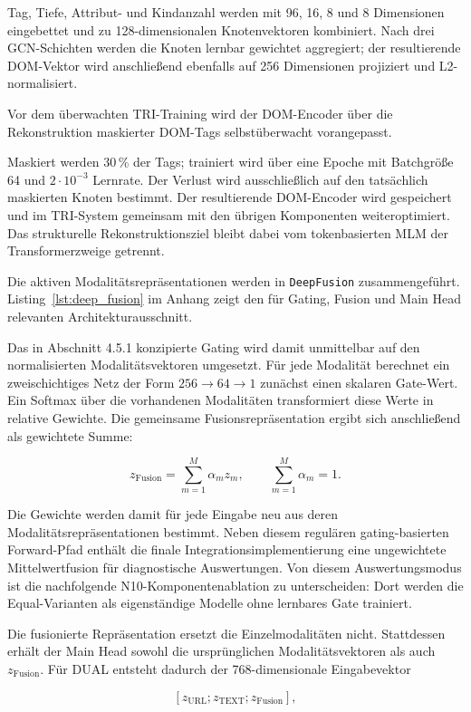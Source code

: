 Tag, Tiefe, Attribut- und Kindanzahl werden mit 96, 16, 8 und 8 Dimensionen eingebettet
und zu 128-dimensionalen Knotenvektoren kombiniert. Nach drei GCN-Schichten werden die
Knoten lernbar gewichtet aggregiert; der resultierende DOM-Vektor wird anschließend ebenfalls
auf 256 Dimensionen projiziert und L2-normalisiert.

Vor dem überwachten TRI-Training wird der DOM-Encoder über die Rekonstruktion maskierter
DOM-Tags selbstüberwacht vorangepasst.

Maskiert werden 30\,\% der Tags; trainiert wird über eine Epoche mit Batchgröße 64 und
$2\cdot10^{-3}$ Lernrate. Der Verlust wird ausschließlich auf den tatsächlich maskierten
Knoten bestimmt. Der resultierende DOM-Encoder wird gespeichert und im TRI-System
gemeinsam mit den übrigen Komponenten weiteroptimiert. Das strukturelle Rekonstruktionsziel
bleibt dabei vom tokenbasierten MLM der Transformerzweige getrennt.

Die aktiven Modalitätsrepräsentationen werden in \texttt{DeepFusion} zusammengeführt.
Listing~\ref{lst:deep_fusion} im Anhang zeigt den für Gating, Fusion und Main Head relevanten
Architekturausschnitt.

Das in Abschnitt 4.5.1 konzipierte Gating wird damit unmittelbar auf den normalisierten
Modalitätsvektoren umgesetzt. Für jede Modalität berechnet ein zweischichtiges Netz der Form
$256 \rightarrow 64 \rightarrow 1$ zunächst einen skalaren Gate-Wert. Ein Softmax über die
vorhandenen Modalitäten transformiert diese Werte in relative Gewichte. Die gemeinsame
Fusionsrepräsentation ergibt sich anschließend als gewichtete Summe:

\[
z_{\mathrm{Fusion}}
=
\sum_{m=1}^{M}\alpha_m z_m,
\qquad
\sum_{m=1}^{M}\alpha_m=1.
\]

Die Gewichte werden damit für jede Eingabe neu aus deren Modalitätsrepräsentationen
bestimmt. Neben diesem regulären gating-basierten Forward-Pfad enthält die finale
Integrationsimplementierung eine ungewichtete Mittelwertfusion für diagnostische
Auswertungen. Von diesem Auswertungsmodus ist die nachfolgende N10-Komponentenablation zu
unterscheiden: Dort werden die Equal-Varianten als eigenständige Modelle ohne lernbares Gate
trainiert.

Die fusionierte Repräsentation ersetzt die Einzelmodalitäten nicht. Stattdessen erhält der Main
Head sowohl die ursprünglichen Modalitätsvektoren als auch $z_{\mathrm{Fusion}}$. Für DUAL
entsteht dadurch der 768-dimensionale Eingabevektor

\[
[z_{\mathrm{URL}};z_{\mathrm{TEXT}};z_{\mathrm{Fusion}}],
\]

